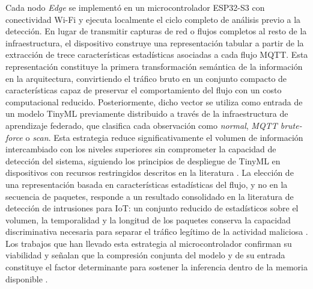 \documentclass[journal,article,submit,moreauthors]{Definitions/mdpi}
\begin{document}
Cada nodo \textit{Edge} se implementó en un microcontrolador ESP32-S3 con conectividad Wi-Fi y ejecuta localmente el ciclo completo de análisis previo a la detección. En lugar de transmitir capturas de red o flujos completos al resto de la infraestructura, el dispositivo construye una representación tabular a partir de la extracción de trece características estadísticas asociadas a cada flujo MQTT. Esta representación constituye la primera transformación semántica de la información en la arquitectura, convirtiendo el tráfico bruto en un conjunto compacto de características capaz de preservar el comportamiento del flujo con un costo computacional reducido. Posteriormente, dicho vector se utiliza como entrada de un modelo TinyML previamente distribuido a través de la infraestructura de aprendizaje federado, que clasifica cada observación como \textit{normal}, \textit{MQTT brute-force} o \textit{scan}. Esta estrategia reduce significativamente el volumen de información intercambiado con los niveles superiores sin comprometer la capacidad de detección del sistema, siguiendo los principios de despliegue de TinyML en dispositivos con recursos restringidos descritos en la literatura \cite{Tekin2023,Amuthadevi2025,Dini2024}. La elección de una representación basada en características estadísticas del flujo, y no en la secuencia de paquetes, responde a un resultado consolidado en la literatura de detección de intrusiones para IoT: un conjunto reducido de estadísticos sobre el volumen, la temporalidad y la longitud de los paquetes conserva la capacidad discriminativa necesaria para separar el tráfico legítimo de la actividad maliciosa \cite{Moustafa2019}. Los trabajos que han llevado esta estrategia al microcontrolador confirman su viabilidad y señalan que la compresión conjunta del modelo y de su entrada constituye el factor determinante para sostener la inferencia dentro de la memoria disponible \cite{Fusco2025,Sun2026}.
\end{document}
